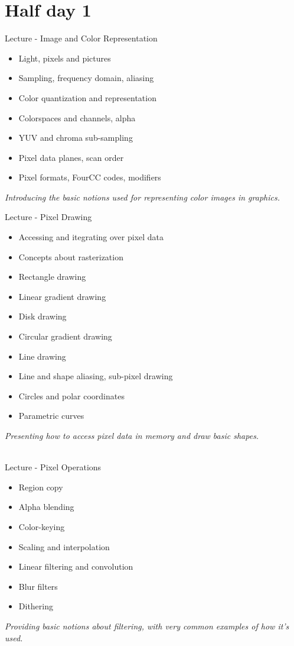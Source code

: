\documentclass[a4paper,12pt,obeyspaces,spaces,hyphens]{article}
\begin{document}
\feshowtitle

\feshowinfo

\section{Half day 1}

\feagendatwocolumn
{Lecture - Image and Color Representation}
{
  \begin{itemize}
  \item Light, pixels and pictures
  \item Sampling, frequency domain, aliasing
  \item Color quantization and representation
  \item Colorspaces and channels, alpha
  \item YUV and chroma sub-sampling
  \item Pixel data planes, scan order
  \item Pixel formats, FourCC codes, modifiers
  \end{itemize}
  \vspace{0.5em}
  {\em Introducing the basic notions used for representing color images in graphics.}
}
{Lecture - Pixel Drawing}
{
  \begin{itemize}
  \item Accessing and itegrating over pixel data
  \item Concepts about rasterization
  \item Rectangle drawing
  \item Linear gradient drawing
  \item Disk drawing
  \item Circular gradient drawing
  \item Line drawing
  \item Line and shape aliasing, sub-pixel drawing
  \item Circles and polar coordinates
  \item Parametric curves
  \end{itemize}
  \vspace{0.5em}
  {\em Presenting how to access pixel data in memory and draw basic shapes.}
}
\\
\feagendatwocolumn
{Lecture - Pixel Operations}
{
  \begin{itemize}
  \item Region copy
  \item Alpha blending
  \item Color-keying
  \item Scaling and interpolation
  \item Linear filtering and convolution
  \item Blur filters
  \item Dithering
  \end{itemize}
  \vspace{0.5em}
  {\em Providing basic notions about filtering, with very common examples of how it's used.}
}
\end{document}
